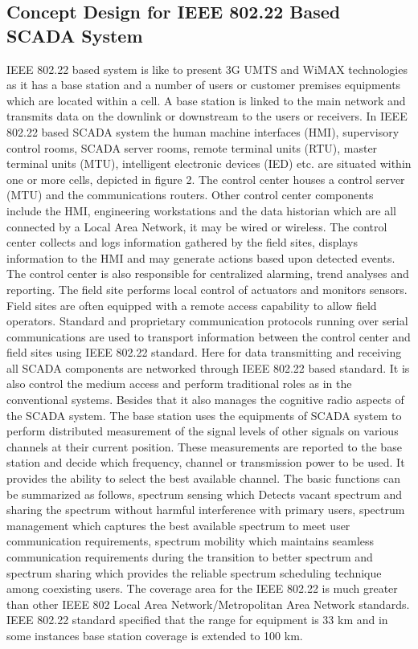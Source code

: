 \documentclass[conference]{IEEEtran}
\begin{document}
\begin{Summary - }
\section{Concept Design for IEEE 802.22 Based SCADA System}
IEEE 802.22 based system is like to present 3G UMTS and
WiMAX technologies as it has a base station and a number of
users or customer premises equipments which are located
within a cell. A base station is linked to the main network and
transmits data on the downlink or downstream to the users or
receivers. In IEEE 802.22 based SCADA system the human
machine interfaces (HMI), supervisory control rooms, SCADA
server rooms, remote terminal units (RTU), master terminal
units (MTU), intelligent electronic devices (IED) etc. are
situated within one or more cells, depicted in figure 2. The
control center houses a control server (MTU) and the
communications routers. Other control center components
include the HMI, engineering workstations and the data
historian which are all connected by a Local Area Network, it
may be wired or wireless. The control center collects and logs
information gathered by the field sites, displays information to
the HMI and may generate actions based upon detected events.
The control center is also responsible for centralized alarming,
trend analyses and reporting. The field site performs local
control of actuators and monitors sensors. Field sites are often
equipped with a remote access capability to allow field
operators. Standard and proprietary communication protocols
running over serial communications are used to transport
information between the control center and field sites using
IEEE 802.22 standard. Here for data transmitting and receiving
all SCADA components are networked through IEEE 802.22
based standard. It is also control the medium access and
perform traditional roles as in the conventional systems.
Besides that it also manages the cognitive radio aspects of the
SCADA system. The base station uses the equipments of
SCADA system to perform distributed measurement of the
signal levels of other signals on various channels at their
current position. These measurements are reported to the base
station and decide which frequency, channel or transmission
power to be used. It provides the ability to select the best
available channel. The basic functions can be summarized as
follows, spectrum sensing which Detects vacant spectrum and
sharing the spectrum without harmful interference with
primary users, spectrum management which captures the best
available spectrum to meet user communication requirements,
spectrum mobility which maintains seamless communication
requirements during the transition to better spectrum and
spectrum sharing which provides the reliable spectrum
scheduling technique among coexisting users. The coverage
area for the IEEE 802.22 is much greater than other IEEE 802
Local Area Network/Metropolitan Area Network standards.
IEEE 802.22 standard specified that the range for equipment is
33 km and in some instances base station coverage is extended
to 100 km.


\end{Summary - }
\end{document}
